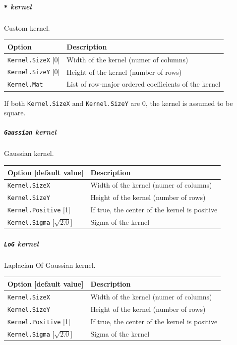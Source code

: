 \documentclass[a4paper,11pt,oneside]{article}
\begin{document}
\subparagraph{\texorpdfstring{%
\lstinline[basicstyle=\ttfamily\bfseries]!*! kernel}{* kernel}}
Custom kernel.

\begin{center}
 \begin{tabular}{| m{4cm} | m{7cm} | }
 \hline
 Option & Description\\
 \hline\hline
  \lstinline!Kernel.SizeX! [0] & Width of the kernel (numer of columns)\\
  \lstinline!Kernel.SizeY! [0] & Height of the kernel (number of rows)\\
  \cellcolor{requiredcolor}\lstinline!Kernel.Mat! & List of row-major ordered
   coefficients of the kernel\\
 \hline
\end{tabular}
\end{center}

If both \lstinline!Kernel.SizeX! and \lstinline!Kernel.SizeY! are 0, the kernel
 is assumed to be square.


\subparagraph{\texorpdfstring{%
\lstinline[basicstyle=\ttfamily\bfseries]!Gaussian! kernel}{Gaussian kernel}}
Gaussian kernel.

\begin{center}
 \begin{tabular}{| m{4cm} | m{7cm} | }
 \hline
 Option [default value] & Description\\
 \hline\hline
  \cellcolor{requiredcolor}\lstinline!Kernel.SizeX! & Width of the kernel
  (numer of columns)\\
  \cellcolor{requiredcolor}\lstinline!Kernel.SizeY! & Height of the kernel
  (number of rows)\\
  \lstinline!Kernel.Positive! [1] & If true, the center of the kernel is
  positive\\
  \lstinline!Kernel.Sigma! [$\sqrt{2.0}$] & Sigma of the kernel\\
 \hline
\end{tabular}
\end{center}


\subparagraph{\texorpdfstring{%
\lstinline[basicstyle=\ttfamily\bfseries]!LoG! kernel}{LoG kernel}}
Laplacian Of Gaussian kernel.

\begin{center}
 \begin{tabular}{| m{4cm} | m{7cm} | }
 \hline
 Option [default value] & Description\\
 \hline\hline
  \cellcolor{requiredcolor}\lstinline!Kernel.SizeX! & Width of the kernel
  (numer of columns)\\
  \cellcolor{requiredcolor}\lstinline!Kernel.SizeY! & Height of the kernel
  (number of rows)\\
  \lstinline!Kernel.Positive! [1] & If true, the center of the kernel is
  positive\\
  \lstinline!Kernel.Sigma! [$\sqrt{2.0}$] & Sigma of the kernel\\
 \hline
\end{tabular}
\end{center}
\end{document}
